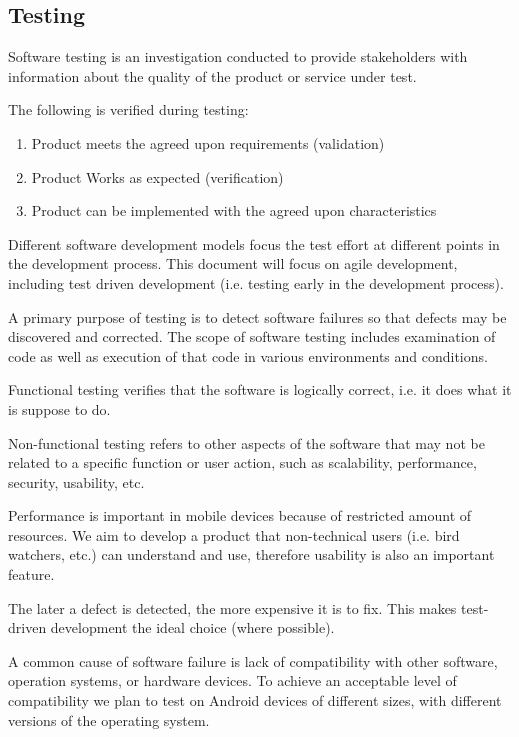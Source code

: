 \subsection{Testing}

Software testing is an investigation conducted to provide stakeholders with
information about the quality of the product or service under
test.\cite{wiki:software-testing}

The following is verified during testing:
\begin{enumerate}
	\item Product meets the agreed upon requirements (validation)
	\item Product Works as expected (verification)
	\item Product can be implemented with the agreed upon characteristics
\end{enumerate}

Different software development models focus the test effort at different
points in the development process. This document will focus on agile
development, including test driven development (i.e. testing early in 
the development process).

A primary purpose of testing is to detect software failures so that
defects may be discovered and corrected. The scope of software testing
includes examination of code as well as execution of that code in
various environments and conditions.

Functional testing verifies that the software is logically correct, 
i.e. it does what it is suppose to do.

Non-functional testing refers to other aspects of the software that
may not be related to a specific function or user action, such as 
scalability, performance, security, usability, etc.

Performance is important in mobile devices because of restricted amount of
resources. We aim to develop a product that non-technical users (i.e.  bird
watchers, etc.) can understand and use, therefore usability is also an
important feature.

The later a defect is detected, the more expensive it is to fix. 
This makes test-driven development the ideal choice (where possible).

A common cause of software failure is lack of compatibility with other software,
operation systems, or hardware devices. To achieve an acceptable level of
compatibility we plan to test on Android devices of different sizes, with
different versions of the operating system. 


